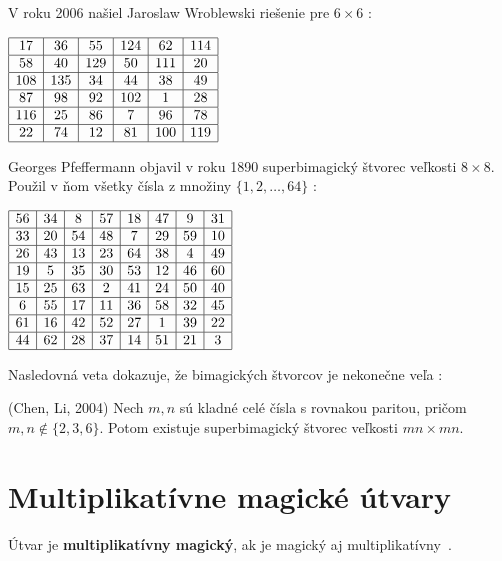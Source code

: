 V roku 2006 našiel Jaroslaw Wroblewski riešenie pre $6 \times 6$ \cite{multimagie}:

\begin{center}
$\begin{array}{ |c|c|c|c|c|c| } 
\hline
17 & 36 & 55 & 124 & 62 & 114 \\ 
\hline
58 & 40 & 129 & 50 & 111 & 20 \\ 
\hline
108 & 135 & 34 & 44 & 38 & 49 \\
\hline
87 & 98 & 92 & 102 & 1 & 28 \\
\hline
116 & 25 & 86 & 7 & 96 & 78 \\
\hline
22 & 74 & 12 & 81 & 100 & 119 \\
\hline
\end{array}$
\end{center}

Georges Pfeffermann objavil v roku 1890 superbimagický štvorec veľkosti $8 \times 8$. Použil v ňom všetky čísla z množiny $\{1, 2, \dots , 64\}$ \cite{multimagie}:

\begin{center}
$\begin{array}{ |c|c|c|c|c|c|c|c| }
\hline
56 & 34 & 8 & 57 & 18 & 47 & 9 & 31 \\ 
\hline
33 & 20 & 54 & 48 & 7 & 29 & 59 & 10 \\ 
\hline
26 & 43 & 13 & 23 & 64 & 38 & 4 & 49 \\ 
\hline
19 & 5 & 35 & 30 & 53 & 12 & 46 & 60 \\ 
\hline
15 & 25 & 63 & 2 & 41 & 24 & 50 & 40 \\ 
\hline
6 & 55 & 17 & 11 & 36 & 58 & 32 & 45 \\ 
\hline
61 & 16 & 42 & 52 & 27 & 1 & 39 & 22 \\ 
\hline
44 & 62 & 28 & 37 & 14 & 51 & 21 & 3 \\ 
\hline
\end{array}$
\end{center}

Nasledovná veta dokazuje, že bimagických štvorcov je nekonečne veľa \cite{bimagic}:

\begin{theorem} (Chen, Li, 2004) Nech $m,n$ sú kladné celé čísla s rovnakou paritou, pričom $m,n \notin \{2,3,6\}$. Potom existuje superbimagický štvorec veľkosti $mn \times mn$.
\end{theorem}

\section{Multiplikatívne magické útvary}
\begin{definition} Útvar je \textbf{multiplikatívny magický}, ak je magický aj multiplikatívny~\cite{multimagie}.
\end{definition}

